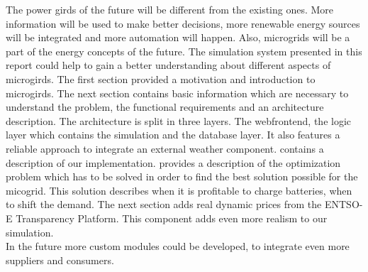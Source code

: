 The power girds of the future will be different from the existing ones. More information will be used to make better decisions, more renewable energy sources will be integrated and more automation will happen. Also, microgrids will be a part of the energy concepts of the future. The simulation system presented in this report could help to gain a better understanding about different aspects of microgirds. The first section provided a motivation and introduction to microgirds. The next section contains basic information which are necessary to understand the problem, the functional requirements and an architecture description. The architecture is split in three layers. The webfrontend, the logic layer which contains the simulation and the database layer. It also features a reliable approach to integrate an external weather component.  contains a description of our implementation.  provides a description of the optimization problem which has to be solved in order to find the best solution possible for the micogrid. This solution describes when it is profitable to charge batteries, when to shift the demand. The next section adds real dynamic prices from the ENTSO-E Transparency Platform. This component adds even more realism to our simulation.\\

\noindent In the future more custom modules could be developed, to integrate even more suppliers and consumers.
